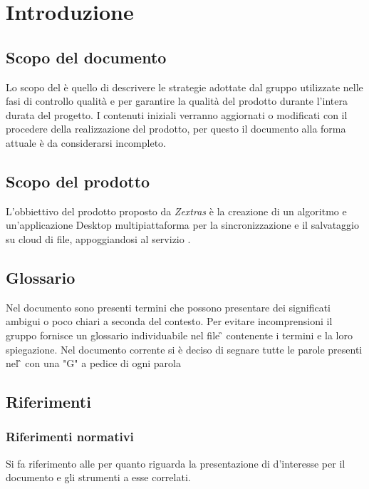 \section{Introduzione}
\subsection{Scopo del documento}

Lo scopo del  \PdQ{}  è quello di descrivere le strategie adottate dal gruppo \gruppo{} utilizzate nelle fasi di controllo qualità e  per garantire la qualità del prodotto durante l'intera durata del progetto.  I contenuti iniziali verranno aggiornati o modificati con il procedere della realizzazione del prodotto,  per questo il documento alla forma attuale è da considerarsi incompleto.  

\subsection{Scopo del prodotto}

L'obbiettivo del prodotto \progetto{} proposto da \textit{Zextras} è la creazione di  un algoritmo e un'applicazione Desktop multipiattaforma per la sincronizzazione e il salvataggio su cloud di file,  appoggiandosi al servizio .  

\subsection{Glossario}

Nel documento sono presenti termini che possono presentare dei significati ambigui o poco chiari a seconda del contesto. Per evitare incomprensioni il gruppo fornisce un glossario individuabile nel file \G{} \versGlo{} contenente i termini e la loro spiegazione. Nel documento corrente si è deciso di segnare tutte le parole presenti nel \G{} con una "G" a pedice di ogni parola

\subsection{Riferimenti}
\subsubsection{Riferimenti normativi}
Si fa riferimento alle \NdP{} \versNdP{} per quanto riguarda la presentazione di  d'interesse per il documento e gli strumenti a esse correlati. 

